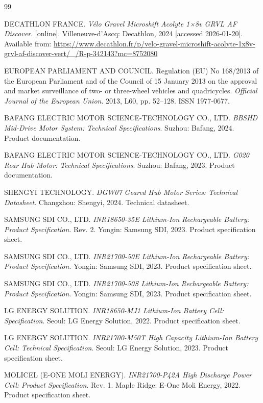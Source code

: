 \documentclass[12pt,a4paper]{article}
\begin{document}
\begin{thebibliography}{99}

DECATHLON FRANCE. \textit{Vélo Gravel Microshift Acolyte 1×8v GRVL AF Discover}. [online]. Villeneuve-d'Ascq: Decathlon, 2024 [accessed 2026-01-20]. Available from: \url{https://www.decathlon.fr/p/velo-gravel-microshift-acolyte-1x8v-grvl-af-discover-vert/_/R-p-342143?mc=8752080}

EUROPEAN PARLIAMENT AND COUNCIL. Regulation (EU) No 168/2013 of the European Parliament and of the Council of 15 January 2013 on the approval and market surveillance of two- or three-wheel vehicles and quadricycles. \textit{Official Journal of the European Union}. 2013, L60, pp. 52--128. ISSN 1977-0677.

BAFANG ELECTRIC MOTOR SCIENCE-TECHNOLOGY CO., LTD. \textit{BBSHD Mid-Drive Motor System: Technical Specifications}. Suzhou: Bafang, 2024. Product documentation.

BAFANG ELECTRIC MOTOR SCIENCE-TECHNOLOGY CO., LTD. \textit{G020 Rear Hub Motor: Technical Specifications}. Suzhou: Bafang, 2023. Product documentation.

SHENGYI TECHNOLOGY. \textit{DGW07 Geared Hub Motor Series: Technical Datasheet}. Changzhou: Shengyi, 2024. Technical datasheet.

SAMSUNG SDI CO., LTD. \textit{INR18650-35E Lithium-Ion Rechargeable Battery: Product Specification}. Rev. 2. Yongin: Samsung SDI, 2023. Product specification sheet.

SAMSUNG SDI CO., LTD. \textit{INR21700-50E Lithium-Ion Rechargeable Battery: Product Specification}. Yongin: Samsung SDI, 2023. Product specification sheet.

SAMSUNG SDI CO., LTD. \textit{INR21700-50S Lithium-Ion Rechargeable Battery: Product Specification}. Yongin: Samsung SDI, 2023. Product specification sheet.

LG ENERGY SOLUTION. \textit{INR18650-MJ1 Lithium-Ion Battery Cell: Specification}. Seoul: LG Energy Solution, 2022. Product specification sheet.

LG ENERGY SOLUTION. \textit{INR21700-M50T High Capacity Lithium-Ion Battery Cell: Technical Specification}. Seoul: LG Energy Solution, 2023. Product specification sheet.

MOLICEL (E-ONE MOLI ENERGY). \textit{INR21700-P42A High Discharge Power Cell: Product Specification}. Rev. 1. Maple Ridge: E-One Moli Energy, 2022. Product specification sheet.


\end{thebibliography}
\end{document}
